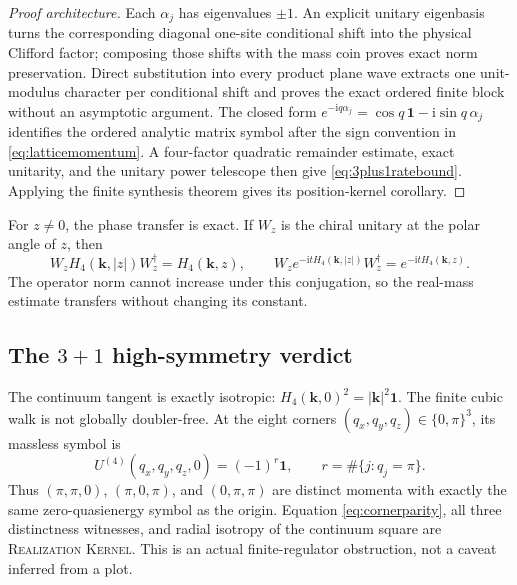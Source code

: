 \documentclass[11pt]{article}
\newcommand{\Kernel}{\textcolor{kernelcolor}{\textsc{Kernel}}}
\newcommand{\Realization}{\textsc{Realization}}
\newcommand{\ii}{\mathrm{i}}
\newcommand{\id}{\mathbf{1}}
\begin{document}
\begin{proof}[Proof architecture]
Each $\alpha_j$ has eigenvalues $\pm1$.  An explicit unitary eigenbasis turns
the corresponding diagonal one-site conditional shift into the physical
Clifford factor; composing those shifts with the mass coin proves exact norm
preservation.  Direct substitution into every product plane wave extracts one
unit-modulus character per conditional shift and proves the exact ordered
finite block without an asymptotic argument.  The closed form
$e^{-\ii q\alpha_j}=\cos q\,\id-\ii\sin q\,\alpha_j$ identifies the ordered
analytic matrix symbol after the sign convention in
\eqref{eq:latticemomentum}.  A four-factor quadratic remainder estimate, exact
unitarity, and the unitary power telescope then give
\eqref{eq:3plus1ratebound}.  Applying the finite synthesis theorem gives its
position-kernel corollary.
\end{proof}

For $z\neq0$, the phase transfer is exact.  If $W_z$ is the chiral unitary at
the polar angle of $z$, then
\[
 W_zH_4(\mathbf k,|z|)W_z^\dagger=H_4(\mathbf k,z),
 \qquad
 W_ze^{-\ii tH_4(\mathbf k,|z|)}W_z^\dagger
   =e^{-\ii tH_4(\mathbf k,z)}.
\]
The operator norm cannot increase under this conjugation, so the real-mass
estimate transfers without changing its constant.

\subsection*{The $3+1$ high-symmetry verdict}

The continuum tangent is exactly isotropic:
$H_4(\mathbf k,0)^2=|\mathbf k|^2\id$.  The finite cubic walk is not globally
doubler-free.  At the eight corners
$(q_x,q_y,q_z)\in\{0,\pi\}^3$, its massless symbol is
\begin{equation}\label{eq:cornerparity}
 U^{(4)}(q_x,q_y,q_z,0)=(-1)^{r}\id,
 \qquad
 r=\#\{j:q_j=\pi\}.
\end{equation}
Thus $(\pi,\pi,0)$, $(\pi,0,\pi)$, and $(0,\pi,\pi)$ are distinct momenta
 with exactly the same zero-quasienergy symbol as the origin.  Equation
 \eqref{eq:cornerparity}, all three distinctness witnesses, and radial isotropy
 of the continuum square are \Realization{} \Kernel{}.  This is an actual
 finite-regulator obstruction, not a caveat inferred from a plot.
\end{document}
